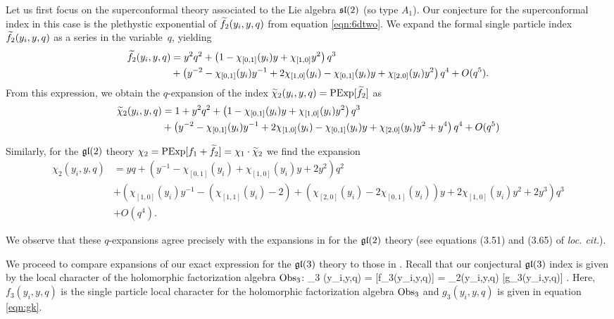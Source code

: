 \parsec
Let us first focus on the superconformal theory associated to the Lie algebra $\mathfrak{sl}(2)$ (so type $A_1$).
Our conjecture for the superconformal index in this case is the plethystic exponential of $\widetilde f_2 (y_i,y,q)$ from equation \eqref{eqn:6dtwo}.
We expand the formal single particle index $\widetilde f_2 (y_i, y, q)$ as a series in the variable~$q$, yielding
\begin{align*}
\widetilde f_2 (y_i,y,q) & = y^2 q^2 + \left(1 - \chi_{[0,1]}(y_i) y + \chi_{[1,0]} y^2 \right) q^3 \\
& + \left(y^{-2} - \chi_{[0,1]}(y_i) y^{-1} + 2 \chi_{[1,0]}(y_i) - \chi_{[0,1]} (y_i) y + \chi_{[2,0]}(y_i) y^2 \right) q^4 + O(q^5) .
\end{align*}
From this expression, we obtain the $q$-expansion of the index $\widetilde \chi_2(y_i,y,q) = \text{PExp}[\widetilde f_2]$ as 
\begin{align*}
\widetilde \chi_2(y_i,y,q) & = 1 + y^2 q^2 + \left(1-\chi_{[0,1]}(y_i) y + \chi_{[1,0]}(y_i)y^2\right)q^3 \\ 
& + \left(y^{-2} - \chi_{[0,1]}(y_i) y^{-1} + 2 \chi_{[1,0]}(y_i) - \chi_{[0,1]} (y_i) y + \chi_{[2,0]}(y_i) y^2 + y^4\right)q^4 + O(q^5)
\end{align*}

Similarly, for the $\mathfrak{gl}(2)$ theory $\chi_2 = \text{PExp}[f_1 + \widetilde f_2] = \chi_1 \cdot \widetilde \chi_2$ we find the expansion
\begin{align*}
\chi_2 (y_i,y,q) & = y q + \left(y^{-1} - \chi_{[0,1]}(y_i) + \chi_{[1,0]}(y_i) y + 2y^2 \right) q^2 \\ 
& + \left( \chi_{[1,0]}(y_i) y^{-1} - (\chi_{[1,1]}(y_i)-2) + (\chi_{[2,0]}(y_i) - 2 \chi_{[0,1]}(y_i)) y + 2 \chi_{[1,0]}(y_i) y^2 + 2y^3\right) q^3 \\ & + O(q^4) .
\end{align*}

We observe that these $q$-expansions agree precisely with the expansions in \cite{Kim:2013nva} for the $\mathfrak{gl}(2)$ theory  
(see equations (3.51) and (3.65) of \textit{loc. cit.}).

\parsec

We proceed to compare expansions of our exact expression for the $\mathfrak{gl}(3)$ theory to those in \cite{Kim:2013nva}. 
Recall that our conjectural $\mathfrak{gl}(3)$ index is given by the local character of the holomorphic factorization algebra $\operatorname{Obs}_3$:
\beqn
\chi_3 (y_i,y,q) = [f_3(y_i,y,q)] = \chi_2(y_i,y,q) \cdot {}[g_3(y_i,y,q)]  .
\eeqn
Here, $f_3(y_i,y,q)$ is the single particle local character for the holomorphic factorization algebra $\operatorname{Obs}_3$ and $g_3(y_i,y,q)$ is given in equation \eqref{eqn:gk}. 

